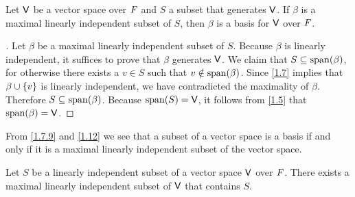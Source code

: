 \begin{thm}\label{1.12}
  Let \(\mathsf{V}\) be a vector space over \(\mathit{F}\) and \(S\) a subset that generates \(\mathsf{V}\).
  If \(\beta\) is a maximal linearly independent subset of \(S\), then \(\beta\) is a basis for \(\mathsf{V}\) over \(\mathit{F}\).
\end{thm}

\begin{proof}[]
  Let \(\beta\) be a maximal linearly independent subset of \(S\).
  Because \(\beta\) is linearly independent, it suffices to prove that \(\beta\) generates \(\mathsf{V}\).
  We claim that \(S \subseteq \spn{\beta}\), for otherwise there exists a \(v \in S\) such that \(v \notin \spn{\beta}\).
  Since \cref{1.7} implies that \(\beta \cup \left\lbrace v\right\rbrace\) is linearly independent, we have contradicted the maximality of \(\beta\).
  Therefore \(S \subseteq \spn{\beta}\).
  Because \(\spn{S} = \V\), it follows from \cref{1.5} that \(\spn{\beta} = \V\).
\end{proof}

\begin{note}
  From \cref{1.7.9} and \cref{1.12} we see that a subset of a vector space is a basis if and only if it is a maximal linearly independent subset of the vector space.
\end{note}

\begin{thm}\label{1.13}
  Let \(S\) be a linearly independent subset of a vector space \(\mathsf{V}\) over \(\mathit{F}\).
  There exists a maximal linearly independent subset of \(\mathsf{V}\) that contains \(S\).
\end{thm}

